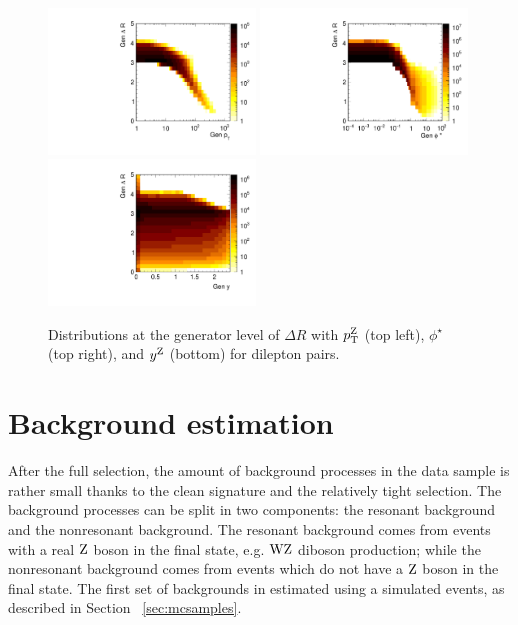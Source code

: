 \begin{figure}
	\centering
	\includegraphics[width=0.49\textwidth]{figures/zpt/ptVdr.pdf}
	\includegraphics[width=0.49\textwidth]{figures/zpt/phiVdr.pdf}
	\includegraphics[width=0.49\textwidth]{figures/zpt/rapVdr.pdf}
	\caption{Distributions at the generator level of $\Delta R$ with $p_{\mathrm{T}}^{\mathrm{Z}}$ (top left), $\phi^\star$ (top right), and $y^{\mathrm{Z}}$ (bottom) for dilepton pairs.}
	\label{fig:gendist4}
\end{figure}

\section{Background estimation}
After the full selection, the amount of background processes in the data sample is 
rather small thanks to the clean signature and the relatively tight selection. 
The background processes can be split in two components:
the resonant background and the nonresonant background. 
The resonant background comes from events with a real $\mathrm{Z}$ boson in the final state, 
e.g. $\mathrm{W}\mathrm{Z}$ diboson production; while the nonresonant background comes from events 
which do not have a $\mathrm{Z}$ boson in the final state.
The first set of backgrounds in estimated using a simulated events, as described in 
Section ~\ref{sec:mcsamples}. 

